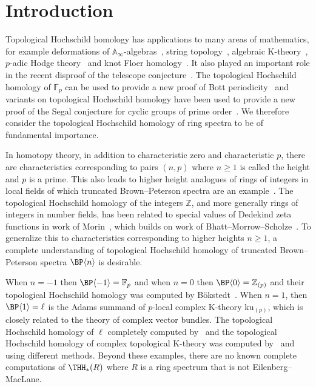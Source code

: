 %

\section{Introduction}
Topological Hochschild homology has applications to many areas of mathematics, for example deformations of $\mathbb{A}_{\infty}$-algebras~\cite{Laz01}, string topology~\cite{CJ02}, algebraic K-theory~\cite{BHM93}, $p$-adic Hodge theory~\cite{BMS19}  and knot Floer homology~\cite{LOT15}. It also played an important role in the recent disproof of the telescope conjecture~\cite{BHLS23}. The topological Hochschild homology of $\mathbb{F}_p$ can be used to provide a new proof of Bott periodicity~\cite{HN20} and variants on topological Hochschild homology have been used to provide a new proof of the Segal conjecture for cyclic groups of prime order~\cites{HW21,AKZ25}. 
We therefore consider the topological Hochschild homology of ring spectra to be of fundamental importance. 

In homotopy theory, in addition to characteristic zero and characteristic $p$, there are characteristics corresponding to pairs $(n,p)$ where $n\ge 1$ is called the height and $p$ is a prime. This also leads to higher height analogues of rings of integers in local fields of which truncated Brown--Peterson spectra are an example~\cite{Rog25}. The topological Hochschild homology of the integers $\mathbb{Z}$, and more generally rings of integers in number fields, has been related to special values of Dedekind zeta functions in work of Morin~\cite{Mor24}, which builds on work of Bhatt--Morrow--Scholze~\cite{BMS19}. To generalize this to characteristics corresponding to higher heights $n\ge 1$, a complete understanding of topological Hochschild homology of truncated Brown--Peterson spectra $\BP\langle n\rangle$ is desirable.



When $n=-1$ then $\BP\langle -1\rangle=\mathbb{F}_p$ and when $n=0$ then $\BP\langle 0\rangle=\mathbb{Z}_{(p)}$ and their topological Hochschild homology was computed by B\"okstedt~\cite{Bok85}. When $n=1$, then $\BP\langle 1\rangle=\ell$ is the Adams summand of $p$-local complex K-theory $\mathrm{ku}_{(p)}$, which is closely related to the theory of complex vector bundles. The topological Hochschild homology of $\ell$ completely computed by~\cite{AHL10} and the topological Hochschild homology of complex topological K-theory was computed by~\cite{Lee22} and \cite{Cha25} using different methods. Beyond these examples, there are no known complete computations of $\THH_*(R)$ where $R$ is a ring spectrum that is not Eilenberg--MacLane.

